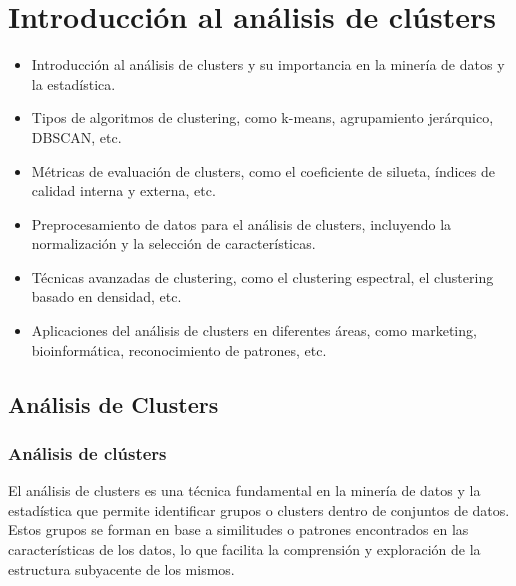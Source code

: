 \documentclass{article}
\begin{document}
\section{Introducción al an\'alisis de cl\'usters}
\begin{itemize}
\item Introducción al análisis de clusters y su importancia en la minería de datos y la estadística.
\item Tipos de algoritmos de clustering, como k-means, agrupamiento jerárquico, DBSCAN, etc.
\item Métricas de evaluación de clusters, como el coeficiente de silueta, índices de calidad interna y externa, etc.
\item Preprocesamiento de datos para el análisis de clusters, incluyendo la normalización y la selección de características.
\item Técnicas avanzadas de clustering, como el clustering espectral, el clustering basado en densidad, etc.
\item Aplicaciones del análisis de clusters en diferentes áreas, como marketing, bioinformática, reconocimiento de patrones, etc.
\end{itemize}

\subsection{Análisis de Clusters}

\subsubsection{An\'alisis de cl\'usters}

El análisis de clusters es una técnica fundamental en la minería de datos y la estadística que permite identificar grupos o clusters dentro de conjuntos de datos. Estos grupos se forman en base a similitudes o patrones encontrados en las características de los datos, lo que facilita la comprensión y exploración de la estructura subyacente de los mismos.
\end{document}
